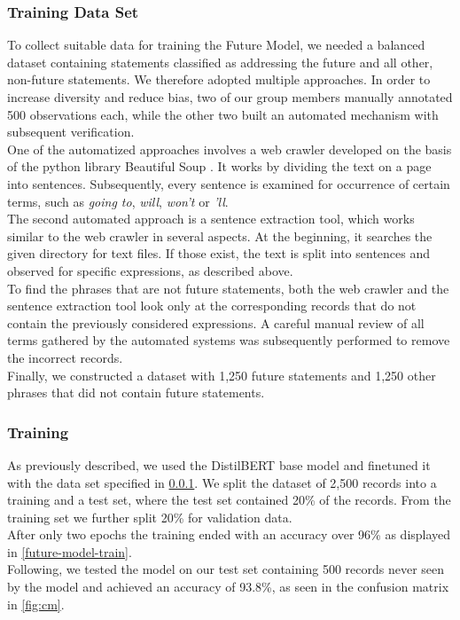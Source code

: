 \subsubsection{Training Data Set}
\label{training}
To collect suitable data for training the Future Model, we needed a balanced dataset containing statements classified as addressing the future and all other, non-future statements. We therefore adopted multiple approaches.
In order to increase diversity and reduce bias, two of our group members manually annotated 500 observations each, while the other two built an automated mechanism with subsequent verification.
\\
One of the automatized approaches involves a web crawler developed on the basis of the python library Beautiful Soup \citep{Richardson2022}.
It works by dividing the text on a page into sentences.
Subsequently, every sentence is examined for occurrence of certain terms, such as \emph{going to}, \emph{will}, \emph{won't} or \emph{'ll}.
\\
The second automated approach is a sentence extraction tool, which works similar to the web crawler in several aspects.
At the beginning, it searches the given directory for text files.
If those exist, the text is split into sentences and observed for specific expressions, as described above.
\\
To find the phrases that are not future statements, both the web crawler and the sentence extraction tool look only at the corresponding records that do not contain the previously considered expressions.
A careful manual review of all terms gathered by the automated systems was subsequently performed to remove the incorrect records.
\\
Finally, we constructed a dataset with 1,250 future statements and 1,250 other phrases that did not contain future statements.

\subsubsection{Training}
As previously described, we used the DistilBERT base model and finetuned it with the data set specified in \ref{training}.
We split the dataset of 2,500 records into a training and a test set, where the test set contained 20\% of the records.
From the training set we further split 20\% for validation data.
\\
After only two epochs the training ended with an accuracy over 96\% as displayed in \autoref{future-model-train}.
\\
Following, we tested the model on our test set containing 500 records never seen by the model and achieved an accuracy of 93.8\%, as seen in the confusion matrix in \autoref{fig:cm}.


